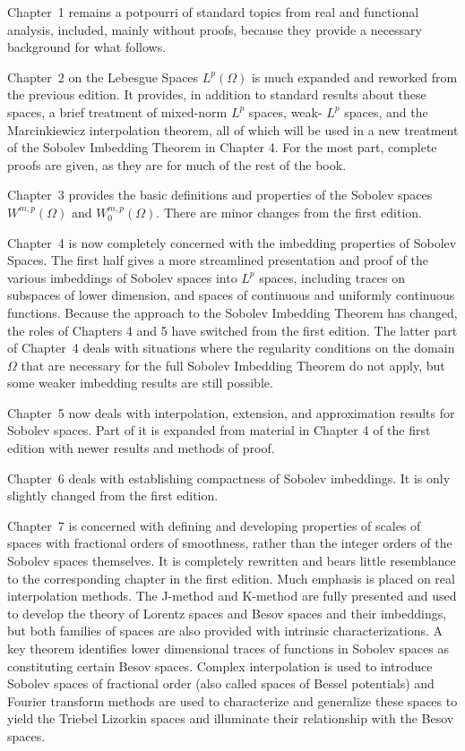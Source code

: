 Chapter~1 remains a potpourri of standard topics from real and functional analysis, included, 
mainly without proofs, because they provide a necessary background for what follows.

Chapter~2 on the Lebesgue Spaces $L^p(\Omega)$ is much expanded and reworked from the previous edition. It provides, in addition to standard results about these spaces, a brief treatment of mixed-norm $L^p$ spaces, weak- $L^p$ spaces, and the Marcinkiewicz interpolation theorem, all of which will be used in a new treatment of the Sobolev Imbedding Theorem in Chapter 4. For the most part, complete proofs are given, as they are for much of the rest of the book.

Chapter~3 provides the basic definitions and properties of the Sobolev spaces $W^{m,p}(\Omega)$ and $W_0^{m, p}(\Omega)$. There are minor changes from the first edition.

Chapter~4 is now completely concerned with the imbedding properties of Sobolev Spaces. The first 
half gives a more streamlined presentation and proof of the various imbeddings of Sobolev spaces 
into $L^p$ spaces, including traces on subspaces of lower dimension, and spaces of continuous and 
uniformly continuous functions. Because the approach to the Sobolev Imbedding Theorem has changed, 
the roles of Chapters 4 and 5 have switched from the first edition. The latter part of Chapter~4 
deals with situations where the regularity conditions on the domain $\Omega$ that are necessary 
for the full Sobolev Imbedding Theorem do not apply, but some weaker imbedding results are still 
possible.

Chapter~5 now deals with interpolation, extension, and approximation results for Sobolev spaces. 
Part of it is expanded from material in Chapter 4 of the first edition with newer results and 
methods of proof.

Chapter~6 deals with establishing compactness of Sobolev imbeddings. It is only slightly changed 
from the first edition.

Chapter~7 is concerned with defining and developing properties of scales of spaces with fractional 
orders of smoothness, rather than the integer orders of the Sobolev spaces themselves. It is 
completely rewritten and bears little resemblance to the corresponding chapter in the first 
edition. Much emphasis is placed on real interpolation methods. The J-method and K-method are 
fully presented and used to develop the theory of Lorentz spaces and Besov spaces and their 
imbeddings, but both families of spaces are also provided with intrinsic characterizations. A
key theorem identifies lower dimensional traces of functions in Sobolev spaces
as constituting certain Besov spaces. Complex interpolation is used to introduce Sobolev spaces of 
fractional order (also called spaces of Bessel potentials) and Fourier transform methods are used 
to characterize and generalize these spaces to yield the Triebel Lizorkin spaces and illuminate 
their relationship with the Besov spaces.

